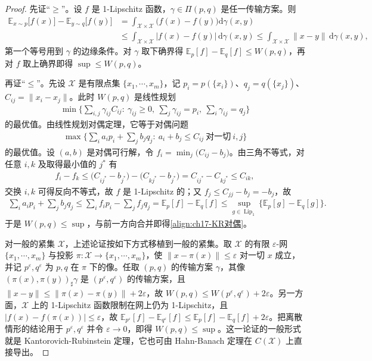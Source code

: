\documentclass[../../main.tex]{subfiles}
\begin{document}
\begin{proof}
先证“$\geqslant$”。设 $f$ 是 1-Lipschitz 函数，$\gamma\in\Pi(p,q)$ 是任一传输方案。则
\begin{align*}
\mathbb{E}_{x\sim p}\big[f(x)\big]-\mathbb{E}_{y\sim q}\big[f(y)\big]
&=\int_{\mathcal{X}\times\mathcal{X}}\big(f(x)-f(y)\big)\mathrm{d}\gamma(x,y)\\
&\leqslant\int_{\mathcal{X}\times\mathcal{X}}\big|f(x)-f(y)\big|\,\mathrm{d}\gamma(x,y)
\leqslant\int_{\mathcal{X}\times\mathcal{X}}\|x-y\|\,\mathrm{d}\gamma(x,y),
\end{align*}
第一个等号用到 $\gamma$ 的边缘条件。对 $\gamma$ 取下确界得 $\mathbb{E}_p[f]-\mathbb{E}_q[f]\leqslant W(p,q)$，再对 $f$ 取上确界即得 $\sup\leqslant W(p,q)$。

再证“$\leqslant$”。先设 $\mathcal{X}$ 是有限点集 $\{x_1,\cdots,x_m\}$，记 $p_i=p(\{x_i\})$、$q_j=q(\{x_j\})$、$C_{ij}=\|x_i-x_j\|$。此时 $W(p,q)$ 是线性规划
\begin{align*}
\min\Big\{\sum_{i,j}\gamma_{ij}C_{ij}:\ \gamma_{ij}\geqslant0,\ \sum_{j}\gamma_{ij}=p_i,\ \sum_{i}\gamma_{ij}=q_j\Big\}
\end{align*}
的最优值。由线性规划对偶定理，它等于对偶问题
\begin{align*}
\max\Big\{\sum_{i}a_ip_i+\sum_{j}b_jq_j:\ a_i+b_j\leqslant C_{ij}\ \text{对一切}\ i,j\Big\}
\end{align*}
的最优值。设 $(a,b)$ 是对偶可行解，令 $f_i=\min_j\big(C_{ij}-b_j\big)$。由三角不等式，对任意 $i,k$ 及取得最小值的 $j^*$ 有
\begin{align*}
f_i-f_k\leqslant\big(C_{ij^*}-b_{j^*}\big)-\big(C_{kj^*}-b_{j^*}\big)=C_{ij^*}-C_{kj^*}\leqslant C_{ik},
\end{align*}
交换 $i,k$ 可得反向不等式，故 $f$ 是 1-Lipschitz 的；又 $f_j\leqslant C_{jj}-b_j=-b_j$，故
\begin{align*}
\sum_{i}a_ip_i+\sum_{j}b_jq_j\leqslant\sum_{i}f_ip_i-\sum_{j}f_jq_j=\mathbb{E}_{p}[f]-\mathbb{E}_{q}[f]\leqslant\sup_{g\in\operatorname{Lip}_1}\Big\{\mathbb{E}_{p}[g]-\mathbb{E}_{q}[g]\Big\}.
\end{align*}
于是 $W(p,q)\leqslant\sup$，与前一方向合并即得\eqref{align:ch17-KR对偶}。

对一般的紧集 $\mathcal{X}$，上述论证按如下方式移植到一般的紧集。取 $\mathcal{X}$ 的有限 $\varepsilon$-网 $\{x_1,\cdots,x_m\}$ 与投影 $\pi:\mathcal{X}\to\{x_1,\cdots,x_m\}$，使 $\|x-\pi(x)\|\leqslant\varepsilon$ 对一切 $x$ 成立，并记 $p^{\varepsilon},q^{\varepsilon}$ 为 $p,q$ 在 $\pi$ 下的像。任取 $(p,q)$ 的传输方案 $\gamma$，其像 $(\pi(x),\pi(y))_{\sharp}\gamma$ 是 $(p^{\varepsilon},q^{\varepsilon})$ 的传输方案，且 $\|x-y\|\leqslant\|\pi(x)-\pi(y)\|+2\varepsilon$，故 $W(p,q)\leqslant W(p^{\varepsilon},q^{\varepsilon})+2\varepsilon$。另一方面，$\mathcal{X}$ 上的 1-Lipschitz 函数限制在网上仍为 1-Lipschitz，且 $|f(x)-f(\pi(x))|\leqslant\varepsilon$，故 $\mathbb{E}_{p^{\varepsilon}}[f]-\mathbb{E}_{q^{\varepsilon}}[f]\leqslant\mathbb{E}_{p}[f]-\mathbb{E}_{q}[f]+2\varepsilon$。把离散情形的结论用于 $p^{\varepsilon},q^{\varepsilon}$ 并令 $\varepsilon\to0$，即得 $W(p,q)\leqslant\sup$。这一论证的一般形式就是 Kantorovich-Rubinstein 定理，它也可由 Hahn-Banach 定理在 $C(\mathcal{X})$ 上直接导出。
\end{proof}
\end{document}
